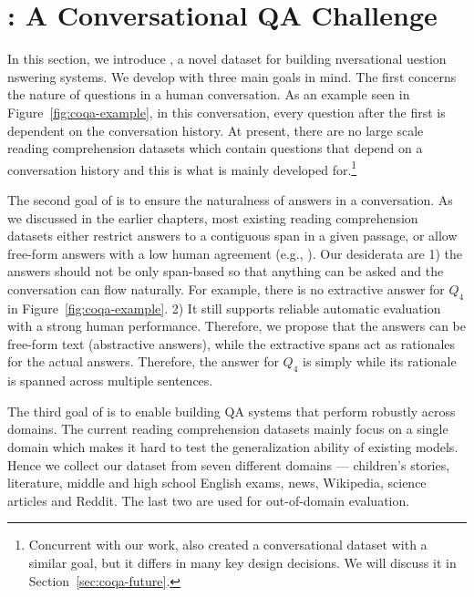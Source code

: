 
\section{: A Conversational QA Challenge}
\label{sec:coqa-dataset}

In this section, we introduce , a novel dataset for building nversational uestion nswering systems. We develop  with three main goals in mind. The first concerns the nature of questions in a human conversation. As an example seen in Figure~\ref{fig:coqa-example}, in this conversation, every question after the first is dependent on the conversation history. At present, there are no large scale reading comprehension datasets which contain questions that depend on a conversation history and this is what  is mainly developed for.\footnote{Concurrent with our work,  also created a conversational dataset with a similar goal, but it differs in many key design decisions. We will discuss it in Section~\ref{sec:coqa-future}.}

The second goal of  is to ensure the naturalness of answers in a conversation. As we discussed in the earlier chapters, most existing reading comprehension datasets either restrict answers to a contiguous span in a given passage, or allow free-form answers with a low human agreement (e.g., ). Our desiderata are 1) the answers should not be only span-based so that anything can be asked and the conversation can flow naturally. For example, there is no extractive answer for $Q_4$  in Figure~\ref{fig:coqa-example}. 2) It still supports reliable automatic evaluation with a strong human performance. Therefore, we propose that the answers can be free-form text (abstractive answers), while the extractive spans act as rationales for the actual answers. Therefore, the answer for $Q_4$ is simply  while its rationale is spanned across multiple sentences.

The third goal of  is to enable building QA systems that perform robustly across domains. The current reading comprehension datasets mainly focus on a single domain which makes it hard to test the generalization ability of existing models. Hence we collect our dataset from seven different domains --- children's stories, literature, middle and high school English exams, news, Wikipedia, science articles and Reddit. The last two are used for out-of-domain evaluation.

